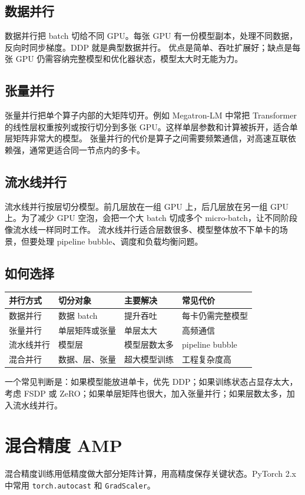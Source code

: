 \subsection{数据并行}
数据并行把 batch 切给不同 GPU。每张 GPU 有一份模型副本，处理不同数据，反向时同步梯度。DDP 就是典型数据并行。
优点是简单、吞吐扩展好；缺点是每张 GPU 仍需容纳完整模型和优化器状态，模型太大时无能为力。
\subsection{张量并行}
张量并行把单个算子内部的大矩阵切开。例如 Megatron-LM 中常把 Transformer 的线性层权重按列或按行切分到多张 GPU。这样单层参数和计算被拆开，适合单层矩阵非常大的模型。
张量并行的代价是算子之间需要频繁通信，对高速互联依赖强，通常更适合同一节点内的多卡。
\subsection{流水线并行}
流水线并行按层切分模型。前几层放在一组 GPU 上，后几层放在另一组 GPU 上。为了减少 GPU 空泡，会把一个大 batch 切成多个 micro-batch，让不同阶段像流水线一样同时工作。
流水线并行适合层数很多、模型整体放不下单卡的场景，但要处理 pipeline bubble、调度和负载均衡问题。
\subsection{如何选择}
\begin{table}[htbp]
  \centering
  \begin{tabular}{llll}
    \toprule
    并行方式 & 切分对象 & 主要解决 & 常见代价 \\
    \midrule
    数据并行 & 数据 batch & 提升吞吐 & 每卡仍需完整模型 \\
    张量并行 & 单层矩阵或张量 & 单层太大 & 高频通信 \\
    流水线并行 & 模型层 & 模型层数太多 & pipeline bubble \\
    混合并行 & 数据、层、张量 & 超大模型训练 & 工程复杂度高 \\
    \bottomrule
  \end{tabular}
\end{table}
一个常见判断是：如果模型能放进单卡，优先 DDP；如果训练状态占显存太大，考虑 FSDP 或 ZeRO；如果单层矩阵也很大，加入张量并行；如果层数太多，加入流水线并行。
\section{混合精度 AMP}
混合精度训练用低精度做大部分矩阵计算，用高精度保存关键状态。PyTorch 2.x 中常用 \texttt{torch.autocast} 和 \texttt{GradScaler}。

